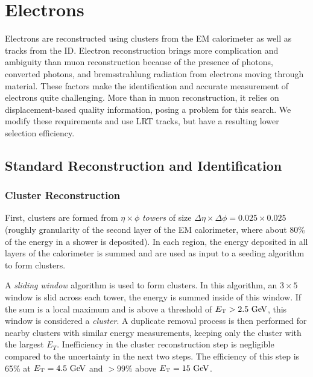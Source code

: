 \section{Electrons}
\label{sec:elecreco}

Electrons are reconstructed using clusters from the \ac{EM} calorimeter as well as tracks from the \ac{ID}. Electron reconstruction brings more complication and ambiguity than muon reconstruction because of the presence of photons, converted photons, and bremsstrahlung radiation from electrons moving through material. These factors make the identification and accurate measurement of electrons quite challenging. More than in muon reconstruction, it relies on displacement-based quality information, posing a problem for this search. We modify these requirements and use \ac{LRT} tracks, but have a resulting lower selection efficiency. 

\subsection{Standard Reconstruction and Identification}


\subsubsection{Cluster Reconstruction}

First, clusters are formed from $\eta \times \phi$ \emph{towers} of size $\Delta \eta \times \Delta \phi = 0.025 \times 0.025$ (roughly granularity of the second layer of the \ac{EM} calorimeter, where about 80\% of the energy in a shower is deposited). In each region, the energy deposited in all layers of the calorimeter is summed and are used as input to a seeding algorithm to form clusters. 

A \emph{sliding window} algorithm is used to form clusters. In this algorithm, an $3 \times 5$ window is slid across each tower, the energy is summed inside of this window. If the sum is a local maximum and is above a threshold of $\et > 2.5 \GeV$, this window is considered a \emph{cluster}. A duplicate removal process is then performed for nearby clusters with similar energy measurements, keeping only the cluster with the largest $E_{T}$. Inefficiency in the cluster reconstruction step is negligible compared to the uncertainty in the next two steps. The efficiency of this step is 65\% at $\et = 4.5 \GeV$ and $> 99\%$ above $\et = 15 \GeV$.

